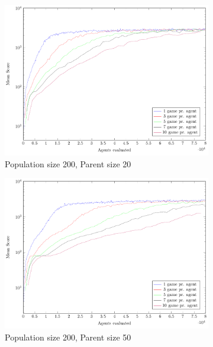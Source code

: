 \begin{figure}
	\captionsetup[subfigure]{justification=centering}
    \begin{subfigure}[b]{0.49\textwidth}
    	\caption{Population size 200, Parent size 20}
        \includegraphics[width=\textwidth]{data/ce_population_offspring/200x_split/constant_l200_o20/mean/PlotFile.pdf}
    \end{subfigure} 
    \begin{subfigure}[b]{0.49\textwidth}
    	\caption{Population size 200, Parent size 50}
        \includegraphics[width=\textwidth]{data/ce_population_offspring/200x_split/constant_l200_o50/mean/PlotFile.pdf}
    \end{subfigure}
    \begin{subfigure}[b]{0.49\textwidth}

\end{subfigure}
\end{figure}
